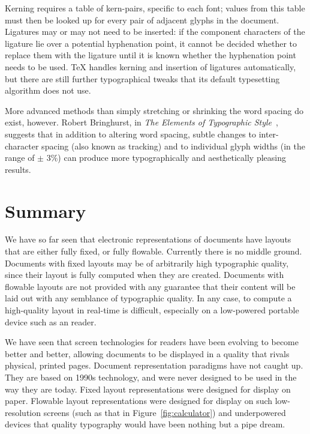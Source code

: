 Kerning requires a table of kern-pairs, specific to each font; values from this table must then be looked up for every pair of adjacent glyphs in the document. Ligatures may or may not need to be inserted: if the component characters of the ligature lie over a potential hyphenation point, it cannot be decided whether to replace them with the ligature until it is known whether the hyphenation point needs to be used. \TeX{} handles kerning and insertion of ligatures automatically, but there are still further typographical tweaks that its default typesetting algorithm does not use.

More advanced methods than simply stretching or shrinking the word spacing do exist, however. Robert Bringhurst, in \emph{The Elements of Typographic Style}~\cite{Bringhurst2008}, suggests that in addition to altering word spacing, subtle changes to inter-character spacing (also known as \gls{tracking}) and to individual glyph widths (in the range of $\pm$ 3\%) can produce more typographically and aesthetically pleasing results.



\section{Summary}

We have so far seen that electronic representations of documents have layouts that are either fully fixed, or fully flowable. Currently there is no middle ground. Documents with fixed layouts may be of arbitrarily high typographic quality, since their layout is fully computed when they are created. Documents with flowable layouts are not provided with any guarantee that their content will be laid out with any semblance of typographic quality. In any case, to compute a high-quality layout in real-time is difficult, especially on a low-powered portable device such as an \ebook{} reader.

We have seen that screen technologies for \ebook{} readers have been evolving to become better and better, allowing documents to be displayed in a quality that rivals physical, printed pages. Document representation paradigms have not caught up. They are based on 1990s technology, and were never designed to be used in the way they are today. Fixed layout representations were designed for display on paper. Flowable layout representations were designed for display on such low-resolution screens (such as that in Figure~\ref{fig:calculator}) and underpowered devices that quality typography would have been nothing but a pipe dream.


